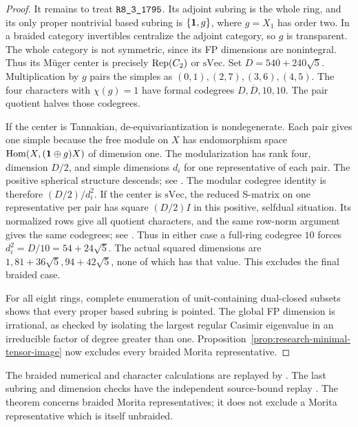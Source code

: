 \begin{proof}
It remains to treat $\sha{R8_3_1795}$.  Its adjoint subring is the
whole ring, and its only proper nontrivial based subring is
$\{\mathbf1,g\}$, where $g=X_1$ has order two.  In a braided category
invertibles centralize the adjoint category, so $g$ is transparent.
The whole category is not symmetric, since its FP dimensions are
nonintegral.  Thus its M\"uger center is precisely $\operatorname{Rep}(C_2)$ or
$\mathrm{sVec}$.
Set $D=540+240\sqrt5$.  Multiplication by $g$ pairs the simples as
$(0,1),(2,7),(3,6),(4,5)$.  The four characters with $\chi(g)=1$
have formal codegrees $D,\overline D,10,10$.  The pair quotient
halves those codegrees.

If the center is Tannakian, de-equivariantization is nondegenerate.
Each pair gives one simple because the free module on $X$ has
endomorphism space
$\operatorname{Hom}(X,(\mathbf1\oplus g)X)$ of dimension one.
The modularization has rank four, dimension $D/2$, and simple
dimensions $d_i$ for one representative of each pair.  The positive
spherical structure descends; see \cite[Proposition~4.56(iii)
and Section~6.3]{DGNO}.  The modular codegree identity is therefore
$(D/2)/d_i^2$.
If the center is $\mathrm{sVec}$, the reduced S-matrix on one
representative per pair has square $(D/2)I$ in this positive,
selfdual situation.  Its normalized rows give all quotient
characters, and the same row-norm argument gives the same codegrees;
see \cite[Lemma~3.1 and Proposition~3.3]{LacabanneSlightly}.
Thus in either case a full-ring codegree $10$ forces
$d_i^2=D/10=54+24\sqrt5$.  The actual squared dimensions are
$1,81+36\sqrt5,94+42\sqrt5$, none of which has that value.
This excludes the final braided case.

For all eight rings, complete enumeration of unit-containing
dual-closed subsets shows that every proper based subring is pointed.
The global FP dimension is irrational, as checked by isolating the
largest regular Casimir eigenvalue in an irreducible factor of degree
greater than one.  Proposition~\ref{prop:research-minimal-tensor-image}
now excludes every braided Morita representative.
\end{proof}

The braided numerical and character calculations are replayed by
.  The last subring and dimension
checks have the independent source-bound replay
.
The theorem concerns braided Morita representatives; it does not
exclude a Morita representative which is itself unbraided.

